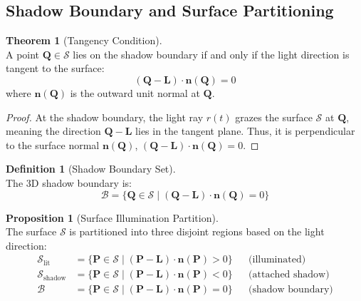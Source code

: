 \documentclass[12pt]{article}
\newcommand{\vect}[1]{\bm{#1}}
\theoremstyle{definition}
\newtheorem{definition}{Definition}[subsection]
\newtheorem{theorem}{Theorem}[subsection]
\newtheorem{proposition}{Proposition}[subsection]
\begin{document}
\subsection{Shadow Boundary and Surface Partitioning} \label{sec:shadow_boundary}

\begin{theorem}[Tangency Condition] \label{thm:tangency} ~\\
A point $\vect{Q} \in \mathcal{S}$ lies on the shadow boundary if and only if the light direction is tangent to the surface:
\begin{equation}
\boxed{(\vect{Q} - \vect{L}) \cdot \vect{n}(\vect{Q}) = 0} \label{eq:tangency}
\end{equation}
where $\vect{n}(\vect{Q})$ is the outward unit normal at $\vect{Q}$.
\end{theorem}

\begin{proof}
At the shadow boundary, the light ray $r(t)$ grazes the surface $\mathcal{S}$ at $\vect{Q}$, meaning the direction $\vect{Q} - \vect{L}$ lies in the tangent plane. Thus, it is perpendicular to the surface normal $\vect{n}(\vect{Q})$,  $(\vect{Q} - \vect{L}) \cdot \vect{n}(\vect{Q}) = 0$.
\end{proof}

\begin{definition}[Shadow Boundary Set] \label{def:boundary_set} ~\\
The 3D shadow boundary is:
\begin{equation}
\boxed{\mathcal{B} = \{\vect{Q} \in \mathcal{S} \mid (\vect{Q} - \vect{L}) \cdot \vect{n}(\vect{Q}) = 0\}} \label{eq:boundary_set}
\end{equation}
\end{definition}

\newpage

\begin{proposition}[Surface Illumination Partition] \label{prop:illumination_partition} ~\\
The surface $\mathcal{S}$ is partitioned into three disjoint regions based on the light direction:
\begin{align}
\mathcal{S}_{\text{lit}} &= \{\vect{P} \in \mathcal{S} \mid (\vect{P} - \vect{L}) \cdot \vect{n}(\vect{P}) > 0\} && \text{(illuminated)} \label{eq:lit_region} \\
\mathcal{S}_{\text{shadow}} &= \{\vect{P} \in \mathcal{S} \mid (\vect{P} - \vect{L}) \cdot \vect{n}(\vect{P}) < 0\} && \text{(attached shadow)} \label{eq:shadow_region} \\
\mathcal{B} &= \{\vect{P} \in \mathcal{S} \mid (\vect{P} - \vect{L}) \cdot \vect{n}(\vect{P}) = 0\} && \text{(shadow boundary)} \label{eq:boundary_region}
\end{align}
\end{proposition}
\end{document}
